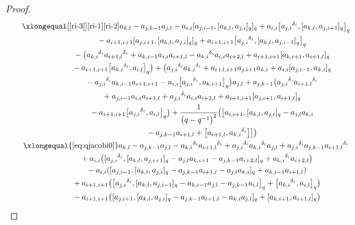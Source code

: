 \documentclass[pdftex]{sigma}
\numberwithin{equation}{section}
\def\d{\delta}
\begin{document}
\begin{proof}
\begin{gather*}
\qquad \xlongequal[\eqref{ri-3}]{\substack{{\eqref{ri-1}\eqref{ri-2}}}} a_{k,l} -a_{j,k-1}a_{j,l}-a_{i,i} [a_{j,i-1}, [a_{k,l},a_{j,i} ]_q ]_q+ a_{i,i} \bigl[{a_{j,i}}^{\d_i}, [a_{k,l},a_{j,i+1} ]_q \bigr]_q \\
 \qquad\qquad\qquad {}-a_{i+1,i+1} [a_{j,i+1}, [a_{k,l},a_{j,i} ]_q ]_q +a_{i+1,i+1} \bigl[{a_{j,i}}^{\d_i}, [a_{k,l},a_{j,i-1} ]_q \bigr]_q \\
 \qquad\qquad \qquad{}- \bigl({a_{k,i}}^{\d_i}{a_{i+1,l}}^{\d_i} +a_{k,i-1}a_{i,i}a_{i+1,l}-{a_{k,i}}^{\d_i}a_{i,i}a_{i+2,l} +a_{i+1,i+1} [a_{k,i+1},a_{i+1,l} ]_q \\
 \qquad\qquad\qquad {}-a_{i+1,i+1} \bigl[{a_{k,i}}^{\d_i},a_{i,l} \bigr]_q \bigr) + \bigl({a_{j,i}}^{\d_i}{a_{k,i}}^{\d_i}+a_{i+1,i+1}a_{j,i+1}a_{k,i} +a_{i,i} [a_{j,i-1},a_{k,i} ]_q \\
 \qquad\qquad \qquad {}-{a_{j,i}}^{\d_i}a_{k,i-1}a_{i+1,i+1} -a_{i,i} \bigl[{a_{j,i}}^{\d_i}, a_{k,i+1} \bigr]_q \bigr)a_{j,l} +a_{j,k-1} \bigl({a_{j,i}}^{\d_i}{a_{i+1,l}}^{\d_i} \\
 \qquad\qquad \qquad {}+a_{j,i-1}a_{i,i}a_{i+1,l}+{a_{j,i}}^{\d_i}a_{i,i}a_{i+2,l} +a_{i+1,i+1} [a_{j,i+1},a_{i+1,l} ]_q\\
 \qquad\qquad \qquad{}-a_{i+1,i+1} \bigl[{a_{j,i}}^{\d_i},a_{i,l} \bigr]_q \bigr) +\frac{1}{\bigl(q-q^{-1}\bigr)^2} \bigl( \bigl[a_{i,i+1}, [a_{k,l},a_{j,i} ]_q -a_{j,l}a_{k,i}\\
 \qquad\qquad \qquad{}-a_{j,k-1}a_{i+1,l} + \bigl[a_{i+1,l},{a_{k,i}}^{\d_i} \bigr] \bigr] \bigr)\\
\qquad \xlongequal{\eqref{eq:qjacobi0} } a_{k,l}-a_{j,k-1}a_{j,l}-{a_{k,i}}^{\d_i}{a_{i+1,l}}^{\d_i} +{a_{j,i}}^{\d_i}{a_{k,i}}^{\d_i}a_{j,l}+{a_{j,i}}^{\d_i}a_{j,k-1}{a_{i+1,l}}^{\d_i}\\
 \qquad\qquad\ \ {}+a_{i,i} \bigl( [{a_{j,i}}^{\d_i}, [a_{k,l},a_{j,i+1} ]_q -a_{j,l}a_{k,i+1} -a_{j,k-1}a_{i+2,l} ]_q+{a_{k,i}}^{\d_i}a_{i+2,l} \bigr)\\
 \qquad\qquad\ \ {}-a_{i,i} ( [a_{j,i-1}, [a_{k,l},a_{j,i} ]_q -a_{j,k-1}a_{i+1,l} -a_{j,l}a_{k,i} ]_q+a_{k,i-1}a_{i+1,l} )\\
 \qquad\qquad\ \ {}+a_{i+1,i+1} \bigl( \bigl[{a_{j,i}}^{\d_i}, [a_{k,l},a_{j,i-1} ]_q -a_{k,i-1}a_{j,l}-a_{j,k-1}a_{i,l} \bigr]_q+ \bigl[{a_{k,i}}^{\d_i},a_{i,l} \bigr]_q \bigr)\\
\qquad\qquad \ \ {}-a_{i+1,i+1} \bigl( [a_{j,i+1}, [a_{k,l},a_{j,i} ]_q -a_{j,k-1}a_{i+1,l}-a_{k,i}a_{j,l} ]_q + [a_{k,i+1},a_{i+1,l} ]_q \bigr)\\

\end{gather*}
\end{proof}
\end{document}
